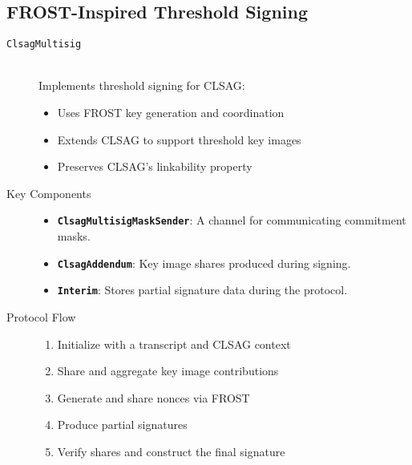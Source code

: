 \documentclass[12pt,a4paper]{article}
\begin{document}
\subsection{FROST-Inspired Threshold Signing}
\begin{description}
\item[\texttt{ClsagMultisig}] \hfill \\ %
Implements threshold signing for CLSAG:
\begin{itemize}
\item Uses FROST key generation and coordination
\item Extends CLSAG to support threshold key images
\item Preserves CLSAG's linkability property
\end{itemize}

\item[Key Components] \hfill  %
\begin{itemize}
\item \textbf{\texttt{ClsagMultisigMaskSender}}: A channel for communicating commitment masks.
\item \textbf{\texttt{ClsagAddendum}}: Key image shares produced during signing.
\item \textbf{\texttt{Interim}}: Stores partial signature data during the protocol.
\end{itemize}

\item[Protocol Flow] \hfill  %
\begin{enumerate}
\item Initialize with a transcript and CLSAG context
\item Share and aggregate key image contributions
\item Generate and share nonces via FROST
\item Produce partial signatures
\item Verify shares and construct the final signature
\end{enumerate}


\end{description}
\end{document}

